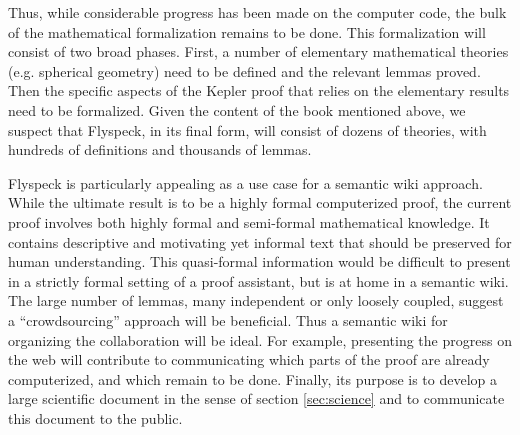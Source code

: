 Thus, while
considerable progress has been made on the computer code, the bulk of
the mathematical formalization remains to be done.  This formalization
will consist of two broad phases.  First, a number of elementary
mathematical theories (e.g. spherical geometry) need to be defined and
the relevant lemmas proved.  Then the specific aspects of the Kepler
proof that relies on the elementary results need to be formalized.
Given the content of the book mentioned above, we suspect that
Flyspeck, in its final form, will consist of dozens of theories, with
hundreds of definitions and thousands of lemmas.

Flyspeck is particularly appealing as a use case for a semantic wiki
approach. While the ultimate result is to be a highly formal
computerized proof, the current proof involves both highly formal and
semi-formal mathematical knowledge.  It contains descriptive and
motivating yet informal text that should be preserved for human
understanding.  This quasi-formal information would be difficult to
present in a strictly formal setting of a proof assistant, but is at
home in a semantic wiki.  The large number of lemmas, many
independent or only loosely coupled, suggest a ``crowdsourcing'' approach will be
beneficial. Thus a semantic wiki for organizing the collaboration
will be ideal.  For example, presenting the progress on the web will
contribute to communicating which parts of the proof are already
computerized, and which remain to be done.  Finally, its purpose is to
develop a large scientific document in the sense of section
\ref{sec:science} and to communicate this document to the public.




